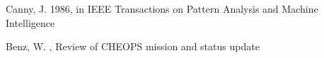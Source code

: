 \documentclass{aa}
\begin{document}
%
%

\begin{thebibliography}{}

 Canny, J. 1986,
      in IEEE Transactions on Pattern Analysis and Machine Intelligence

 Benz, W. , 
      Review of CHEOPS mission and status update

\end{thebibliography}
\end{document}
